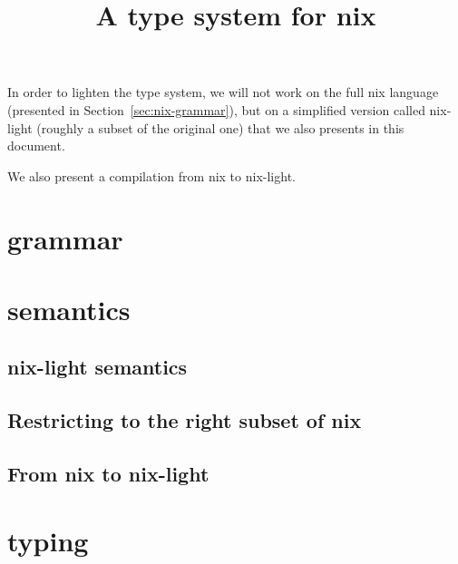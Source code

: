 

\title{A type system for nix}


\maketitle

In order to lighten the type system, we will not work on the full nix language
(presented in Section~\ref{sec:nix-grammar}), but on a simplified version
called nix-light (roughly a subset of the original one) that we also presents
in this document.

We also present a compilation from nix to nix-light.

\section{grammar}


\section{semantics}

\subsection{nix-light semantics}


\subsection{Restricting to the right subset of nix}


\subsection{From nix to nix-light}


\section{typing}



\todos{}





